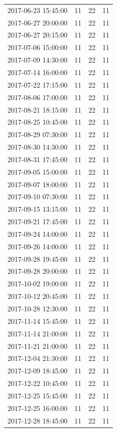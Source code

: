 \begin{tabular}{lrrr}
2017-06-23 15:45:00 & 11 & 22 & 11 \\
2017-06-27 20:00:00 & 11 & 22 & 11 \\
2017-06-27 20:15:00 & 11 & 22 & 11 \\
2017-07-06 15:00:00 & 11 & 22 & 11 \\
2017-07-09 14:30:00 & 11 & 22 & 11 \\
2017-07-14 16:00:00 & 11 & 22 & 11 \\
2017-07-22 17:15:00 & 11 & 22 & 11 \\
2017-08-06 17:00:00 & 11 & 22 & 11 \\
2017-08-21 18:15:00 & 11 & 22 & 11 \\
2017-08-25 10:45:00 & 11 & 22 & 11 \\
2017-08-29 07:30:00 & 11 & 22 & 11 \\
2017-08-30 14:30:00 & 11 & 22 & 11 \\
2017-08-31 17:45:00 & 11 & 22 & 11 \\
2017-09-05 15:00:00 & 11 & 22 & 11 \\
2017-09-07 18:00:00 & 11 & 22 & 11 \\
2017-09-10 07:30:00 & 11 & 22 & 11 \\
2017-09-15 13:15:00 & 11 & 22 & 11 \\
2017-09-21 17:45:00 & 11 & 22 & 11 \\
2017-09-24 14:00:00 & 11 & 22 & 11 \\
2017-09-26 14:00:00 & 11 & 22 & 11 \\
2017-09-28 19:45:00 & 11 & 22 & 11 \\
2017-09-28 20:00:00 & 11 & 22 & 11 \\
2017-10-02 19:00:00 & 11 & 22 & 11 \\
2017-10-12 20:45:00 & 11 & 22 & 11 \\
2017-10-28 12:30:00 & 11 & 22 & 11 \\
2017-11-14 15:45:00 & 11 & 22 & 11 \\
2017-11-14 21:00:00 & 11 & 22 & 11 \\
2017-11-21 21:00:00 & 11 & 22 & 11 \\
2017-12-04 21:30:00 & 11 & 22 & 11 \\
2017-12-09 18:45:00 & 11 & 22 & 11 \\
2017-12-22 10:45:00 & 11 & 22 & 11 \\
2017-12-25 15:45:00 & 11 & 22 & 11 \\
2017-12-25 16:00:00 & 11 & 22 & 11 \\
2017-12-28 18:45:00 & 11 & 22 & 11 \\

\end{tabular}
